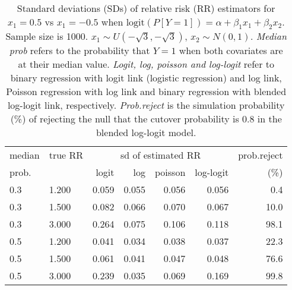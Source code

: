 \documentclass[12pt,a4paper]{article}
\begin{document}
\begin{table}[H] 
\small\sf\centering 
\caption{Standard deviations (SDs) of relative risk (RR) estimators for $x_1=0.5$ vs $x_1=-0.5$ when $\mbox{logit}(P[Y=1])=\alpha+\beta_1 x_1 + \beta_2 x_2$. Sample size is 1000. $x_1 \sim $$U(-\sqrt{3},-\sqrt{3})$, $x_2 \sim N(0,1)$. {\it Median prob} refers to the probability that $Y=1$ when both covariates are at their median value. {\it Logit, log, poisson and log-logit} refer to binary regression with logit link (logistic regression) and log link, Poisson regression with log link and binary regression with blended log-logit link, respectively. {\it Prob.reject} is the simulation probability (\%) of rejecting the null that the cutover probability is $0.8$ in the blended log-logit model.} 
\begin{tabular}{llrrrrr} 
\toprule 
median & true RR & \multicolumn{4}{c}{sd of estimated RR} & prob.reject \\ 
prob. & & logit & log & poisson & log-logit  & (\%) \\ \midrule 
0.3 & 1.200 & 0.059 & 0.055 & 0.056 & 0.056 &  0.4 \\  
0.3 & 1.500 & 0.082 & 0.066 & 0.070 & 0.067 & 10.0 \\  
0.3 & 3.000 & 0.264 & 0.075 & 0.106 & 0.118 & 98.1 \\  
0.5 & 1.200 & 0.041 & 0.034 & 0.038 & 0.037 & 22.3 \\  
0.5 & 1.500 & 0.061 & 0.041 & 0.047 & 0.048 & 76.6 \\  
0.5 & 3.000 & 0.239 & 0.035 & 0.069 & 0.169 & 99.8 \\  
\bottomrule 
\end{tabular} 
\end{table} 
\end{document}
